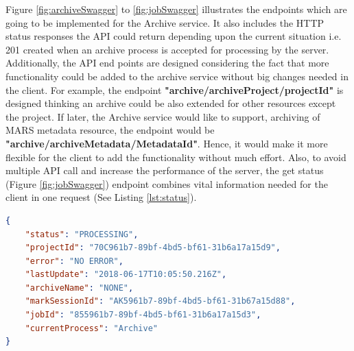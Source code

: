     Figure \ref{fig:archiveSwagger} to \ref{fig:jobSwagger} illustrates the endpoints which are going to be implemented for the Archive service. It also includes the HTTP 
    status responses the API could return depending upon the current situation i.e. 201 created when an archive process is accepted for processing by the server.
    Additionally, the API end points are designed considering the fact that more functionality could be added to the archive service without big changes needed in the client. 
    For example, the endpoint \textbf{"archive/archiveProject/{{projectId}}"} is designed thinking an archive could be also extended for other resources except the project. If later,
    the Archive service would like to support, archiving of MARS metadata resource, the endpoint would be \textbf{"archive/archiveMetadata/{{MetadataId}}"}.
    Hence, it would make it more flexible for the client to add the functionality without much effort. Also, to avoid multiple API call and
    increase the performance of the server, the get status (Figure \ref{fig:jobSwagger}) endpoint combines vital information needed for the client in one 
    request (See Listing \ref{lst:status}). 
    
\newpage
\begin{lstlisting}[caption={Sucessful GET request for a archive status}, language=json,firstnumber=1, captionpos=b, label={lst:status}]
{
    "status": "PROCESSING",
    "projectId": "70C961b7-89bf-4bd5-bf61-31b6a17a15d9",
    "error": "NO ERROR",
    "lastUpdate": "2018-06-17T10:05:50.216Z",
    "archiveName": "NONE",
    "markSessionId": "AK5961b7-89bf-4bd5-bf61-31b67a15d88",
    "jobId": "855961b7-89bf-4bd5-bf61-31b6a17a15d3",
    "currentProcess": "Archive"
}
\end{lstlisting}







    
